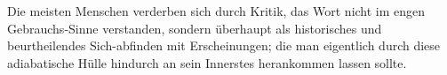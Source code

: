 Die meisten Menschen verderben sich durch Kritik, das Wort nicht im engen Gebrauchs-Sinne verstanden, sondern überhaupt als historisches und beurtheilendes Sich-abfinden mit Erscheinungen; die man eigentlich durch diese adiabatische Hülle hindurch an sein Innerstes herankommen lassen sollte.
\par

